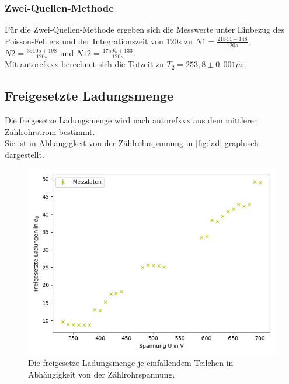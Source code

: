 \subsubsection{Zwei-Quellen-Methode}
 Für die Zwei-Quellen-Methode ergeben sich die Messwerte unter Einbezug des 
 Poisson-Fehlers und der Integrationszeit von $120$s zu $N1 = \frac{21844 \pm 148}{120s}$, $N2 = \frac{39105 \pm 198}{120s}$ 
 und $N12 = \frac{17594 \pm 133}{120s}$.\\
 Mit autoref{xxx} berechnet sich die Totzeit zu $T_2 = 253,8 \pm 0,001 \mu$s.




\subsection{Freigesetzte Ladungsmenge}

Die freigesetze Ladungsmenge wird nach autoref{xxx} aus dem mittleren Zählrohrstrom
bestimmt.\\
Sie ist in Abhängigkeit von der Zählrohrspannung in \autoref{fig:lad} graphisch dargestellt.\\
\begin{figure}[H]
  \centering
  \includegraphics{content/figure_2.png}
  \caption{Die freigesetze Ladungsmenge je einfallendem Teilchen in Abhängigkeit von der Zählrohrspannung.}
  \label{fig:lad}
\end{figure}


